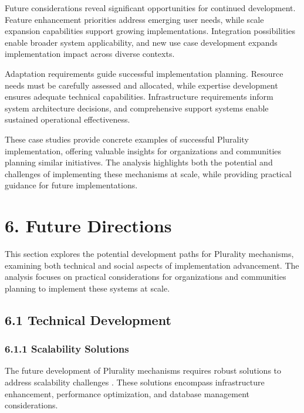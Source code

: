 Future considerations reveal significant opportunities for continued development. Feature enhancement priorities address emerging user needs, while scale expansion capabilities support growing implementations. Integration possibilities enable broader system applicability, and new use case development expands implementation impact across diverse contexts.

Adaptation requirements guide successful implementation planning. Resource needs must be carefully assessed and allocated, while expertise development ensures adequate technical capabilities. Infrastructure requirements inform system architecture decisions, and comprehensive support systems enable sustained operational effectiveness.

These case studies provide concrete examples of successful Plurality implementation, offering valuable insights for organizations and communities planning similar initiatives. The analysis highlights both the potential and challenges of implementing these mechanisms at scale, while providing practical guidance for future implementations.

\hypertarget{future-directions}{%
\section{6. Future Directions}\label{future-directions}}

This section explores the potential development paths for Plurality mechanisms, examining both technical and social aspects of implementation advancement. The analysis focuses on practical considerations for organizations and communities planning to implement these systems at scale.

\hypertarget{technical-development}{%
\subsection{6.1 Technical Development}\label{technical-development}}

\hypertarget{scalability-solutions}{%
\subsubsection{6.1.1 Scalability Solutions}\label{scalability-solutions}}

The future development of Plurality mechanisms requires robust solutions to address scalability challenges \citep{communitynotes2024}. These solutions encompass infrastructure enhancement, performance optimization, and database management considerations.


